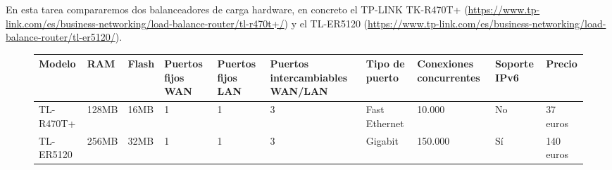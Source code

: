 \documentclass[12pt,spanish]{article}
\begin{document}
En esta tarea compararemos dos balanceadores de carga hardware, en concreto el TP-LINK TK-R470T+ (\href{https://www.tp-link.com/es/business-networking/load-balance-router/tl-r470t+/}{https://www.tp-link.com/es/business-networking/load-balance-router/tl-r470t+/}) y el TL-ER5120 (\href{https://www.tp-link.com/es/business-networking/load-balance-router/tl-er5120/}{https://www.tp-link.com/es/business-networking/load-balance-router/tl-er5120/}).\\

\begin{figure}[H]
	\footnotesize
	\begin{tabular}{|p{1.2cm}|p{1.1cm}|p{1.1cm}|p{1.1cm}|p{1.3cm}|p{1.3cm}|p{1.2cm}|p{1.7cm}|p{1.1cm}|p{1.2cm}|}
		\hline
		Modelo & RAM & Flash & Puertos fijos WAN & Puertos fijos LAN & Puertos intercambiables WAN/LAN &  Tipo de puerto & Conexiones concurrentes & Soporte IPv6 &  Precio \\
		\hline
		TL-R470T+ & 128MB & 16MB & 1 & 1 & 3 & Fast Ethernet & 10.000 & No & 37 euros \\
		\hline
		TL-ER5120 & 256MB & 32MB & 1 & 1 & 3 & Gigabit & 150.000  & Sí & 140 euros\\
		\hline
	\end{tabular}
\end{figure}
\end{document}
